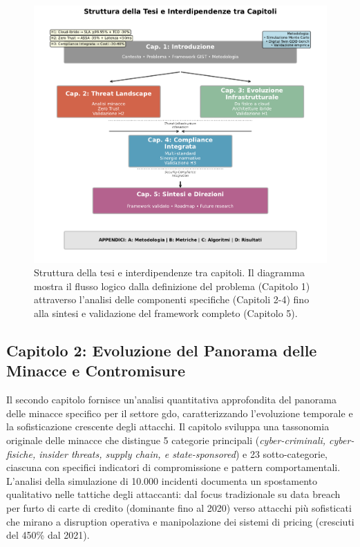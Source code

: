\begin{figure}[htbp]
\centering
\includegraphics[width=1\textwidth]{thesis_figures/cap1/fig_1_4_thesis_structure.pdf}
\caption{Struttura della tesi e interdipendenze tra capitoli. Il diagramma mostra il flusso logico dalla definizione del problema (Capitolo 1) attraverso l'analisi delle componenti specifiche (Capitoli 2-4) fino alla sintesi e validazione del framework completo (Capitolo 5).}
\label{fig:thesis_structure}
\end{figure}

\subsection{Capitolo 2: Evoluzione del Panorama delle Minacce e Contromisure}

\label{ssec:struttura_cap2}
Il secondo capitolo fornisce un'analisi quantitativa approfondita del panorama delle minacce specifico per il settore \gls{gdo}, caratterizzando l'evoluzione temporale e la sofisticazione crescente degli attacchi. Il capitolo sviluppa una tassonomia originale delle minacce che distingue 5 categorie principali (\emph{cyber-criminali, cyber-fisiche, insider threats, supply chain, e state-sponsored}) e 23 sotto-categorie, ciascuna con specifici indicatori di compromissione e pattern comportamentali. L'analisi della simulazione di 10.000 incidenti documenta un spostamento qualitativo nelle tattiche degli attaccanti: dal focus tradizionale su data breach per furto di carte di credito (dominante fino al 2020) verso attacchi più sofisticati che mirano a disruption operativa e manipolazione dei sistemi di pricing (cresciuti del 450\% dal 2021).

